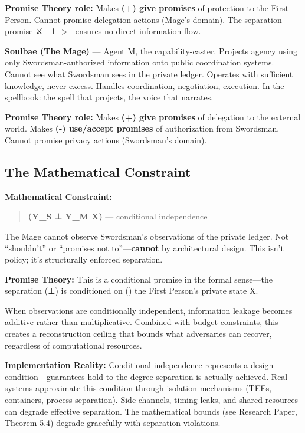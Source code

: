\documentclass[
]{article}
\begin{document}
\textbf{Promise Theory role:} Makes \textbf{(+) give promises} of
protection to the First Person. Cannot promise delegation actions
(Mage's domain). The separation promise ⚔️ --⊥--\textgreater{} 🧙
ensures no direct information flow.

\textbf{Soulbae (The Mage)} --- Agent M, the capability-caster. Projects
agency using only Swordsman-authorized information onto public
coordination systems. Cannot see what Swordsman sees in the private
ledger. Operates with sufficient knowledge, never excess. Handles
coordination, negotiation, execution. In the spellbook: the spell that
projects, the voice that narrates.

\textbf{Promise Theory role:} Makes \textbf{(+) give promises} of
delegation to the external world. Makes \textbf{(-) use/accept promises}
of authorization from Swordsman. Cannot promise privacy actions
(Swordsman's domain).

\subsection{The Mathematical
Constraint}\label{the-mathematical-constraint}

\textbf{Mathematical Constraint:}

\begin{quote}
\textbf{(Y\_S ⊥ Y\_M \textbar{} X)} --- conditional independence
\end{quote}

The Mage cannot observe Swordsman's observations of the private ledger.
Not ``shouldn't'' or ``promises not to''---\textbf{cannot} by
architectural design. This isn't policy; it's structurally enforced
separation.

\textbf{Promise Theory:} This is a conditional promise in the formal
sense---the separation (⊥) is conditioned on (\textbar) the First
Person's private state X.

When observations are conditionally independent, information leakage
becomes additive rather than multiplicative. Combined with budget
constraints, this creates a reconstruction ceiling that bounds what
adversaries can recover, regardless of computational resources.

\textbf{Implementation Reality:} Conditional independence represents a
design condition---guarantees hold to the degree separation is actually
achieved. Real systems approximate this condition through isolation
mechanisms (TEEs, containers, process separation). Side-channels, timing
leaks, and shared resources can degrade effective separation. The
mathematical bounds (see Research Paper, Theorem 5.4) degrade gracefully
with separation violations.
\end{document}
